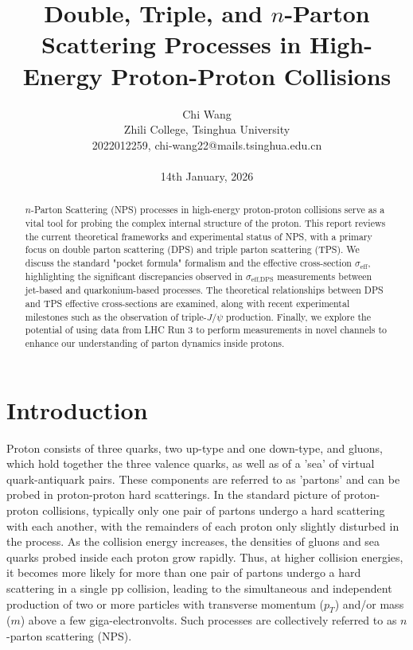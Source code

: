 \documentclass[10pt,twocolumn]{article}
\begin{document}
\title{Double, Triple, and $n$-Parton Scattering Processes in High-Energy Proton-Proton Collisions}

\author{Chi Wang
\\
Zhili College, Tsinghua University
\\
2022012259, chi-wang22@mails.tsinghua.edu.cn
\\
\\
14th January, 2026
\\
}

\maketitle
\thispagestyle{empty}

\begin{abstract}

$n$-Parton Scattering (NPS) processes in high-energy proton-proton collisions serve as a vital tool for probing the complex internal structure of the proton. This report reviews the current theoretical frameworks and experimental status of NPS, with a primary focus on double parton scattering (DPS) and triple parton scattering (TPS). We discuss the standard "pocket formula" formalism and the effective cross-section $\sigma_{\text{eff}}$, highlighting the significant discrepancies observed in $\sigma_{\text{eff,DPS}}$ measurements between jet-based and quarkonium-based processes. The theoretical relationships between DPS and TPS effective cross-sections are examined, along with recent experimental milestones such as the observation of triple-$J/\psi$ production. Finally, we explore the potential of using data from LHC Run 3 to perform measurements in novel channels to enhance our understanding of parton dynamics inside protons.

\end{abstract}


\section{Introduction}

Proton consists of three quarks, two up-type and one down-type, and gluons, which hold together the three valence quarks, as well as of a 'sea' of virtual quark-antiquark pairs.
These components are referred to as 'partons' and can be probed in proton-proton hard scatterings.
In the standard picture of proton-proton collisions, typically only one pair of partons undergo a hard scattering with each another, with the remainders of each proton only slightly disturbed in the process.
As the collision energy increases, the densities of gluons and sea quarks probed inside each proton grow rapidly. Thus, at higher collision energies, it becomes more likely for more than one pair of partons undergo a hard scattering in a single pp collision, leading to the simultaneous and independent production of two or more particles with transverse momentum ($p_T$) and/or mass ($m$) above a few giga-electronvolts.
Such processes are collectively referred to as $n$-parton scattering (NPS).
\end{document}

